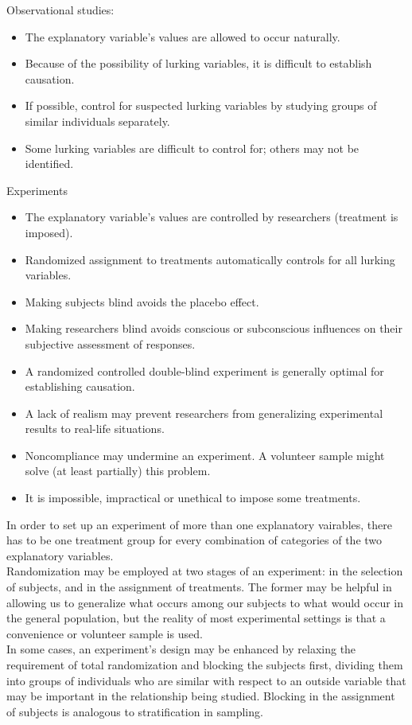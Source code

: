 \documentclass[10pt, a4paper]{article}
\begin{document}
Observational studies:
\begin{itemize}
\item The explanatory variable's values are allowed to occur naturally.
\item Because of the possibility of lurking variables, it is difficult to establish causation.
\item If possible, control for suspected lurking variables by studying groups of similar individuals separately.
\item Some lurking variables are difficult to control for; others may not be identified.
\end{itemize}
Experiments
\begin{itemize}
\item The explanatory variable's values are controlled by researchers (treatment is imposed).
\item Randomized assignment to treatments automatically controls for all lurking variables.
\item Making subjects blind avoids the placebo effect.
\item Making researchers blind avoids conscious or subconscious influences on their subjective assessment of responses.
\item A randomized controlled double-blind experiment is generally optimal for establishing causation.
\item A lack of realism may prevent researchers from generalizing experimental results to real-life situations.
\item Noncompliance may undermine an experiment. A volunteer sample might solve (at least partially) this problem.
\item It is impossible, impractical or unethical to impose some treatments.
\end{itemize}
In order to set up an experiment of more than one explanatory vairables, there has to be one treatment group for every combination of categories of the two explanatory variables.\\
Randomization may be employed at two stages of an experiment: in the selection of subjects, and in the assignment of treatments. The former may be helpful in allowing us to generalize what occurs among our subjects to what would occur in the general population, but the reality of most experimental settings is that a convenience or volunteer sample is used. \\
In some cases, an experiment's design may be enhanced by relaxing the requirement of total randomization and blocking the subjects first, dividing them into groups of individuals who are similar with respect to an outside variable that may be important in the relationship being studied. Blocking in the assignment of subjects is analogous to stratification in sampling.
\end{document}
